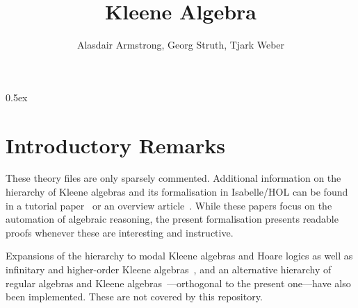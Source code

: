 \documentclass[11pt,a4paper]{article}
\begin{document}
\title{Kleene Algebra}
\author{Alasdair Armstrong, Georg Struth, Tjark Weber}
\maketitle

\tableofcontents

\parindent 0pt\parskip 0.5ex

\section{Introductory Remarks}

These theory files are only sparsely commented. Additional information
on the hierarchy of Kleene algebras and its formalisation in
Isabelle/HOL can be found in a tutorial
paper~\cite{fosterstruthweber11tutorial} or an overview
article~\cite{guttmannstruthweber11tarskikleene}. While these papers
focus on the automation of algebraic reasoning, the present
formalisation presents readable proofs whenever these are interesting
and instructive.

Expansions of the hierarchy to modal Kleene algebras and Hoare logics
as well as infinitary and higher-order Kleene
algebras~\cite{guttmannstruthweber11algmeth,armstrongstruth12hoka},
and an alternative hierarchy of regular algebras and Kleene
algebras~\cite{fosterstruth12regalg}---orthogonal to the present
one---have also been implemented. These are not covered by this
repository.





\end{document}
